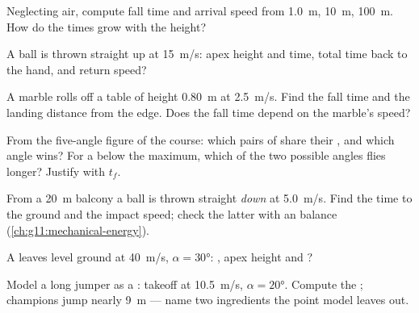 \begin{exercise}[$\star$]\label{exo:g12:projectile-motion:3}
Neglecting air, compute fall time and arrival speed from \qty{1.0}{m},
\qty{10}{m}, \qty{100}{m}. How do the times grow with the height?
\end{exercise}

\begin{exercise}[$\star$]\label{exo:g12:projectile-motion:4}
A ball is thrown straight up at \qty{15}{m/s}: apex height and time,
total time back to the hand, and return speed?
\end{exercise}

\begin{exercise}[$\star$]\label{exo:g12:projectile-motion:5}
A marble rolls off a table of height \qty{0.80}{m} at \qty{2.5}{m/s}. Find
the fall time and the landing distance from the edge. Does the fall time
depend on the marble's speed?
\end{exercise}

\begin{exercise}[$\star\star$]\label{exo:g12:projectile-motion:6}
From the five-angle figure of the course: which pairs of 
share their , and which angle wins? For a  below the maximum,
which of the two possible angles flies longer? Justify with $t_f$.
\end{exercise}

\begin{exercise}[$\star\star$]\label{exo:g12:projectile-motion:7}
From a \qty{20}{m} balcony a ball is thrown straight \emph{down} at
\qty{5.0}{m/s}. Find the time to the ground and the impact speed; check
the latter with an  balance (\cref{ch:g11:mechanical-energy}).
\end{exercise}

\begin{exercise}[$\star\star$]\label{exo:g12:projectile-motion:8}
A  leaves level ground at \qty{40}{m/s}, $\alpha = \ang{30}$:
, apex height and ?
\end{exercise}

\begin{exercise}[$\star\star$]\label{exo:g12:projectile-motion:9}
Model a long jumper as a : takeoff at \qty{10.5}{m/s},
$\alpha = \ang{20}$. Compute the ; champions jump nearly \qty{9}{m}
--- name two ingredients the point model leaves out.
\end{exercise}

